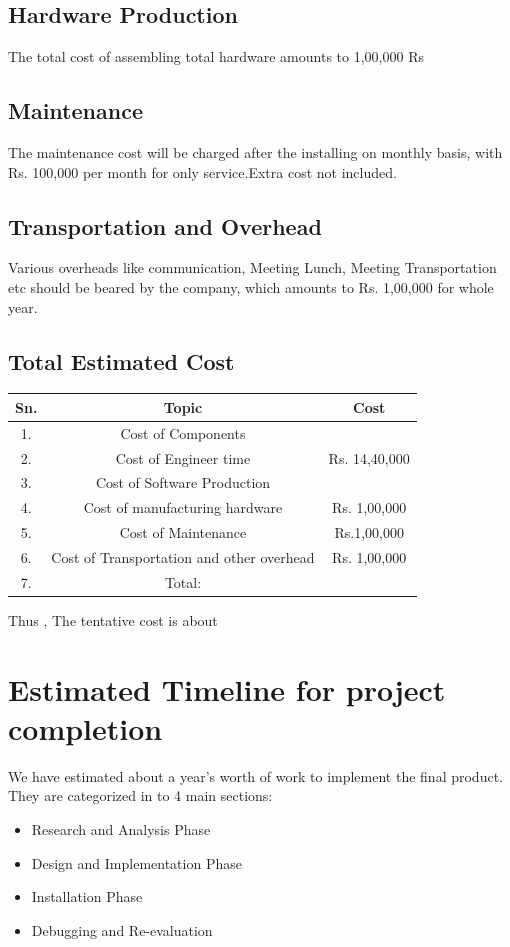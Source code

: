 \documentclass[12pt]{article}
\begin{document}
\subsection{Hardware Production}
The total cost of assembling total hardware amounts to 1,00,000 Rs
\subsection{Maintenance}
The maintenance cost will be charged after the installing on monthly basis,
with Rs. 100,000 per month for only service.Extra cost not included.
\subsection{Transportation and Overhead}
Various overheads like communication, Meeting Lunch, Meeting Transportation etc should
be beared by the company, which amounts to Rs. 1,00,000 for whole year.
\subsection{Total Estimated Cost}
\begin{table}
\begin{tabular}{|c|c|c|}
\hline
Sn. & Topic & Cost \\
\hline
1. & Cost of Components & \\
2. & Cost of Engineer time & Rs. 14,40,000\\
3. & Cost of Software Production & \\
4. & Cost of manufacturing hardware & Rs. 1,00,000\\
5. & Cost of Maintenance & Rs.1,00,000\\
6. & Cost of Transportation and other overhead & Rs. 1,00,000\\
7. & Total: & \\
\hline
\end{tabular}
\end{table}
Thus , The tentative cost is about
\newpage

\section{Estimated Timeline for project completion}
We have estimated about a year's worth of work to implement the final product.
They are categorized in to 4 main sections:
\begin{itemize}
\item Research and Analysis Phase
\item Design and Implementation Phase
\item Installation Phase
\item Debugging and Re-evaluation
\end{itemize} 
\end{document}
